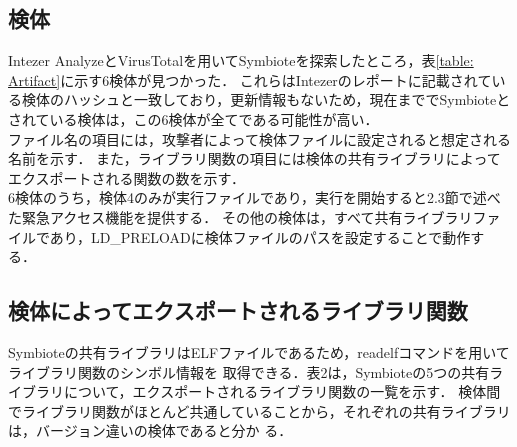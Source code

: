 \documentclass[submit,techreq,noauthor]{eco}	%
\begin{document}
\subsection{検体}
Intezer AnalyzeとVirusTotalを用いてSymbioteを探索したところ，表\ref{table: Artifact}に示す6検体が見つかった．
これらはIntezerのレポートに記載されている検体のハッシュと一致しており，更新情報もないため，現在まででSymbioteとされている検体は，この6検体が全てである可能性が高い．\\
ファイル名の項目には，攻撃者によって検体ファイルに設定されると想定される名前を示す．
また，ライブラリ関数の項目には検体の共有ライブラリによってエクスポートされる関数の数を示す．\\
\indent
6検体のうち，検体4のみが実行ファイルであり，実行を開始すると2.3節で述べた緊急アクセス機能を提供する．
その他の検体は，すべて共有ライブラリファイルであり，LD\_PRELOADに検体ファイルのパスを設定することで動作する．

\subsection{検体によってエクスポートされるライブラリ関数}
Symbioteの共有ライブラリはELFファイルであるため，readelfコマンドを用いてライブラリ関数のシンボル情報を
取得できる．表2は，Symbioteの5つの共有ライブラリについて，エクスポートされるライブラリ関数の一覧を示す．
検体間でライブラリ関数がほとんど共通していることから，それぞれの共有ライブラリは，バージョン違いの検体であると分か
る．
\end{document}
